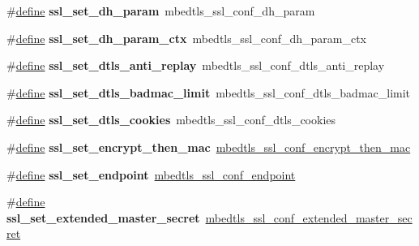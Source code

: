 \begin{DoxyCompactItemize}
\#\hyperlink{structdefine}{define} {\bfseries ssl\+\_\+set\+\_\+dh\+\_\+param}~mbedtls\+\_\+ssl\+\_\+conf\+\_\+dh\+\_\+param
\item 
\mbox{\label{compat-1_83_8h_a04d60b1e077149ba8f88a1f0008a7030}} 
\#\hyperlink{structdefine}{define} {\bfseries ssl\+\_\+set\+\_\+dh\+\_\+param\+\_\+ctx}~mbedtls\+\_\+ssl\+\_\+conf\+\_\+dh\+\_\+param\+\_\+ctx
\item 
\mbox{\label{compat-1_83_8h_ad28e786eb108a1a15326606ff2323b91}} 
\#\hyperlink{structdefine}{define} {\bfseries ssl\+\_\+set\+\_\+dtls\+\_\+anti\+\_\+replay}~mbedtls\+\_\+ssl\+\_\+conf\+\_\+dtls\+\_\+anti\+\_\+replay
\item 
\mbox{\label{compat-1_83_8h_a0cba4fe6a1649b3345cf17403a9a94a9}} 
\#\hyperlink{structdefine}{define} {\bfseries ssl\+\_\+set\+\_\+dtls\+\_\+badmac\+\_\+limit}~mbedtls\+\_\+ssl\+\_\+conf\+\_\+dtls\+\_\+badmac\+\_\+limit
\item 
\mbox{\label{compat-1_83_8h_a014fd007a6e3bf07f7edd7311d5f21a0}} 
\#\hyperlink{structdefine}{define} {\bfseries ssl\+\_\+set\+\_\+dtls\+\_\+cookies}~mbedtls\+\_\+ssl\+\_\+conf\+\_\+dtls\+\_\+cookies
\item 
\mbox{\label{compat-1_83_8h_a531e999209196c97ed6f272ddbf7b047}} 
\#\hyperlink{structdefine}{define} {\bfseries ssl\+\_\+set\+\_\+encrypt\+\_\+then\+\_\+mac}~\hyperlink{ssl_8h_afa8a1d55630fec25f2247fc9958eaa53}{mbedtls\+\_\+ssl\+\_\+conf\+\_\+encrypt\+\_\+then\+\_\+mac}
\item 
\mbox{\label{compat-1_83_8h_a63b471b477ae3af01462cb59cdfa4074}} 
\#\hyperlink{structdefine}{define} {\bfseries ssl\+\_\+set\+\_\+endpoint}~\hyperlink{ssl_8h_a3a763e35d55c18e6792a3b756d825684}{mbedtls\+\_\+ssl\+\_\+conf\+\_\+endpoint}
\item 
\mbox{\label{compat-1_83_8h_ad76d69aff9c31a4eb698d8c21c1c4848}} 
\#\hyperlink{structdefine}{define} {\bfseries ssl\+\_\+set\+\_\+extended\+\_\+master\+\_\+secret}~\hyperlink{ssl_8h_a133db91d4a1dd44d212ac57e386c23b3}{mbedtls\+\_\+ssl\+\_\+conf\+\_\+extended\+\_\+master\+\_\+secret}
\item 
\mbox{\label{compat-1_83_8h_a506b1d0d0a9f3036e3d23d138fe56ef9}} 

\end{DoxyCompactItemize}
